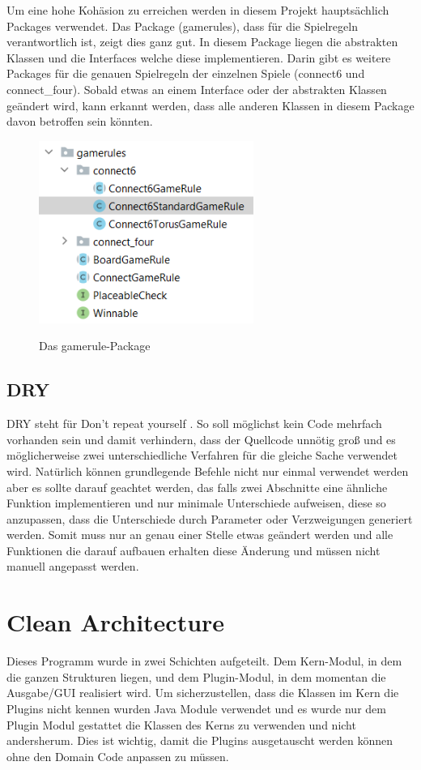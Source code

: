 \documentclass[12pt]{article}
\newcommand{\pkgGamerule}{\includegraphics[width=7cm]{Bilder/gamerules}}
\begin{document}
Um eine hohe Kohäsion zu erreichen werden in diesem Projekt hauptsächlich Packages verwendet. Das Package (gamerules), dass für die Spielregeln verantwortlich ist, zeigt dies ganz gut. In diesem Package liegen die abstrakten Klassen und die Interfaces welche diese implementieren. Darin gibt es weitere Packages für die genauen Spielregeln der einzelnen Spiele (connect6 und connect\_four). Sobald etwas an einem Interface oder der abstrakten Klassen geändert wird, kann erkannt werden, dass alle anderen Klassen in diesem Package davon betroffen sein könnten.

\begin{figure}[H]
\centering
{\pkgGamerule}
\caption{Das gamerule-Package}
\label{fig:pkgGamerule}
\end{figure}



\subsection{DRY}
DRY steht für \glqq Don't repeat yourself \grqq. So soll möglichst kein Code mehrfach vorhanden sein und damit verhindern, dass der Quellcode unnötig groß und es möglicherweise zwei unterschiedliche Verfahren für die gleiche Sache verwendet wird. Natürlich können grundlegende Befehle nicht nur einmal verwendet werden aber es sollte darauf geachtet werden, das falls zwei Abschnitte eine ähnliche Funktion implementieren und nur minimale Unterschiede aufweisen, diese so anzupassen, dass die Unterschiede durch Parameter oder Verzweigungen generiert werden. Somit muss nur an genau einer Stelle etwas geändert werden und alle Funktionen die darauf aufbauen erhalten diese Änderung und müssen nicht manuell angepasst werden.



\newpage
\section{Clean Architecture}
Dieses Programm wurde in zwei Schichten aufgeteilt. Dem Kern-Modul, in dem die ganzen Strukturen liegen, und dem Plugin-Modul, in dem momentan die Ausgabe/GUI realisiert wird. Um sicherzustellen, dass die Klassen im Kern die Plugins nicht kennen wurden Java Module verwendet und es wurde nur dem Plugin Modul gestattet die Klassen des Kerns zu verwenden und nicht andersherum. Dies ist wichtig, damit die Plugins ausgetauscht werden können ohne den Domain Code anpassen zu müssen.
\\
\end{document}
